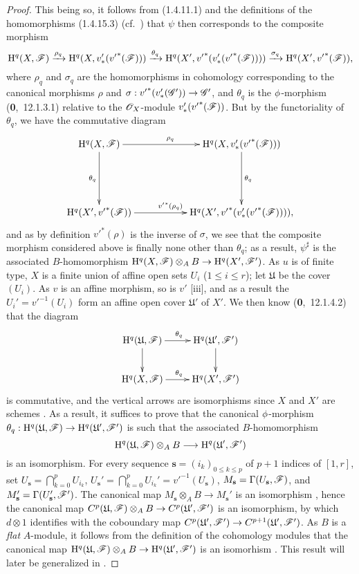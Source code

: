 \begin{proof}
This being so, it follows from (1.4.11.1) and the definitions of the homomorphisms (1.4.15.3) (cf.~) that $\psi$ then corresponds to the composite morphism
\[
  \mathrm{H}^q(X,\mathscr{F})\xrightarrow{\rho_q}\mathrm{H}^q(X,v_*'({v'}^*(\mathscr{F})))\xrightarrow{\theta_q}\mathrm{H}^q(X',{v'}^*(v_*'({v'}^*(\mathscr{F}))))\xrightarrow{\sigma_q}\mathrm{H}^q(X',{v'}^*(\mathscr{F})),
\]
where $\rho_q$ and $\sigma_q$ are the homomorphisms in cohomology corresponding to the canonical morphisms $\rho$ and $\sigma:{v'}^*(v_*'(\sh{G}'))\to\sh{G}'$, and $\theta_q$ is the $\phi$-morphism (\textbf{0},~12.1.3.1) relative to the $\mathscr{O}_X$-module $v_*'({v'}^*(\mathscr{F}))$.
But by the functoriality of $\theta_q$, we have the commutative diagram
\[
  \xymatrix{
    \HH^q(X,\sh{F})\ar[rr]^{\rho_q}\ar[dd]_{\theta_q} & &
    \HH^q(X,v_*'({v'}^*(\sh{F})))\ar[dd]^{\theta_q}\\\\
    \HH^q(X',{v'}^*(\sh{F}))\ar[rr]^{{v'}^*(\rho_q)} & &
    \HH^q(X',{v'}^*(v_*'({v'}^*(\sh{F})))),
  }
\]
and as by definition  ${v'}^*(\rho)$ is the inverse of $\sigma$, we see that the composite morphism considered above is finally none other than $\theta_q$; as a result, $\psi^\sharp$ is the associated $B$-homomorphism $\HH^q(X,\sh{F})\otimes_A B\to\HH^q(X',\sh{F}')$.
As $u$ is of finite type, $X$ is a finite union of affine open sets $U_i$ ($1\leq i\leq r$); let $\mathfrak{U}$ be the cover $(U_i)$.
As $v$ is an affine morphism, so is $v'$ [iii], and as a result the $U_i'={v'}^{-1}(U_i)$ form an affine open cover $\mathfrak{U}'$ of $X'$.
We then know (\textbf{0},~12.1.4.2) that the diagram
\[
  \xymatrix{
    \HH^q(\mathfrak{U},\sh{F})\ar[r]^{\theta_q}\ar[d] &
    \HH^q(\mathfrak{U}',\sh{F}')\ar[d]\\
    \HH^q(X,\sh{F})\ar[r]^{\theta_q} &
    \HH^q(X',\sh{F}')
  }
\]
is commutative, and the vertical arrows are isomorphisms since $X$ and $X'$ are schemes .
As a result, it suffices to prove that the canonical $\phi$-morphism $\theta_q:\HH^q(\mathfrak{U},\sh{F})\to\HH^q(\mathfrak{U}',\sh{F}')$ is such that the associated $B$-homomorphism
\[
  \HH^q(\mathfrak{U},\sh{F})\otimes_A B\to\HH^q(\mathfrak{U}',\sh{F}')
\]
is an isomorphism.
For every sequence $\mathbf{s}=(i_k)_{0\leq k\leq p}$ of $p+1$ indices of $[1,r]$, set $U_\mathbf{s}=\bigcap_{k=0}^p U_{i_k}$, $U_\mathbf{s}'=\bigcap_{k=0}^p U_{i_k}'={v'}^{-1}(U_\mathbf{s})$, $M_\mathbf{s}=\Gamma(U_\mathbf{s},\mathscr{F})$, and $M_\mathbf{s}'=\Gamma(U_\mathbf{s}',\mathscr{F}')$.
The canonical map $M_\mathbf{s}\otimes_A B\to M_\mathbf{s}'$ is an isomorphism , hence the canonical map $C^p(\mathfrak{U},\sh{F})\otimes_A B\to C^p(\mathfrak{U}',\sh{F}')$ is an isomorphism, by which $d\otimes 1$ identifies with the coboundary map $C^p(\mathfrak{U}',\sh{F}')\to C^{p+1}(\mathfrak{U}',\sh{F}')$.
As $B$ is a \emph{flat} $A$-module, it follows from the definition of the cohomology modules that the canonical map $\HH^q(\mathfrak{U},\sh{F})\otimes_A B\to\HH^q(\mathfrak{U}',\sh{F}')$ is an isomorhism .
This result will later be generalized in .
\end{proof}


